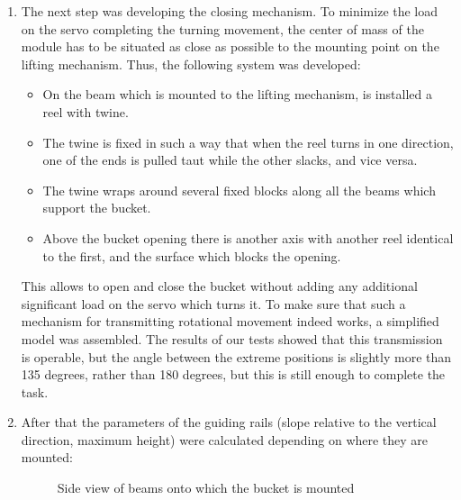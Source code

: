 \begin{enumerate}
  \item The next step was developing the closing mechanism. To minimize the load on the servo completing the turning movement, the center of mass of the module has to be situated as close as possible to the mounting point on the lifting mechanism. Thus, the following system was developed:
    \begin{itemize}
      \item On the beam which is mounted to the lifting mechanism, is installed a reel with twine.
      \item The twine is fixed in such a way that when the reel turns in one direction, one of the ends is pulled taut while the other  slacks, and vice versa.
      \item The twine wraps around several fixed blocks along all the beams which support the bucket.
      \item Above the bucket opening there is another axis with another reel identical to the first, and the surface which blocks the opening.
   \end{itemize} 
  This allows to open and close the bucket without adding any additional significant load on the servo which turns it. To make sure that such a mechanism for transmitting rotational movement indeed works, a simplified model was assembled. The results of our tests showed that this transmission is operable, but the angle between the extreme positions is slightly more than 135 degrees, rather than 180 degrees, but this is still enough to complete the task. 
  \item After that the parameters of the guiding rails (slope relative to the vertical direction, maximum height) were calculated depending on where they are mounted: 
  \begin{figure}[h]
  	\begin{minipage}[h]{1\linewidth}
   	    \caption{Side view of beams onto which the bucket is mounted}

\end{minipage}
\end{figure}
\end{enumerate}
